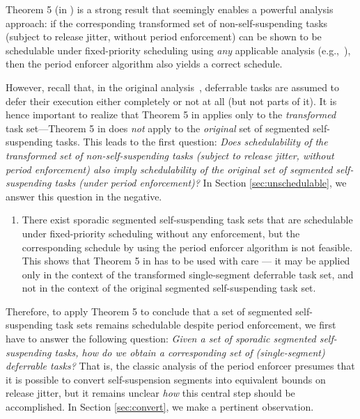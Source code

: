 Theorem 5 (in \cite{Raj:suspension1991}) is a strong result that seemingly enables a powerful analysis approach: if the corresponding transformed set of non-self-suspending tasks (subject to release jitter, without period enforcement) can be shown to be schedulable under fixed-priority scheduling using \emph{any} applicable analysis (e.g.,~\cite{ABRTW:93}), then the period enforcer algorithm also yields a correct schedule.

However, recall that, in the original analysis~\cite{Raj:suspension1991}, deferrable tasks are assumed to defer their  execution either completely or not at all (but not parts of it). It is hence important to realize that Theorem 5 in \cite{Raj:suspension1991} applies only to the \emph{transformed} task set---Theorem 5 in \cite{Raj:suspension1991} does \emph{not} apply to the \emph{original} set of segmented self-suspending tasks. This leads to the first question: \emph{Does schedulability of the transformed set of non-self-suspending tasks (subject to release jitter, without period enforcement) also imply schedulability of the original set of segmented self-suspending tasks (under period enforcement)?}  In Section \ref{sec:unschedulable}, we answer this question in the negative.

\begin{enumerate}
	\item There exist sporadic segmented self-suspending task sets that are schedulable under fixed-priority scheduling without any enforcement, but the corresponding schedule by using the period enforcer algorithm is not feasible. This shows that Theorem 5 in \cite{Raj:suspension1991} has to be  used with care --- it may be applied only in the context of the transformed single-segment deferrable task set, and not in the context of the original segmented self-suspending task set.
\end{enumerate}


Therefore, to apply Theorem 5 to conclude that a set of segmented self-suspending task sets remains schedulable despite period enforcement, we first have to answer the following question: \emph{Given a set of sporadic segmented self-suspending tasks, how do we obtain a corresponding set of (single-segment) deferrable tasks?} That is, the classic analysis of the period enforcer \cite{Raj:suspension1991} presumes that it is possible to convert self-suspension segments into equivalent bounds on release jitter, but it remains unclear \emph{how} this central step should be accomplished. In Section \ref{sec:convert}, we make a pertinent observation.

